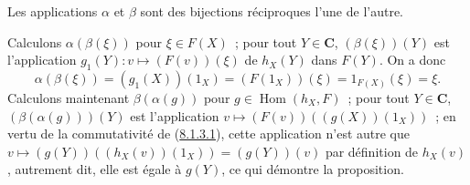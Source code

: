 \begin{proposition}[8.1.4]
\label{0.8.1.4-fr}
Les applications $\alpha$ et $\beta$ sont des bijections réciproques l'une de
l'autre.
\end{proposition}

Calculons $\alpha(\beta(\xi))$ pour $\xi\in F(X)$~; pour tout $Y\in\boldsymbol{C}$,
$(\beta(\xi))(Y)$ est l'application
$g_1(Y):v\mapsto(F(v))(\xi)$ de $h_X(Y)$ dans $F(Y)$. On a donc
\[
  \alpha(\beta(\xi))=(g_1(X))(1_X)=(F(1_X))(\xi)
  =1_{F(X)}(\xi)=\xi.
\]
Calculons maintenant $\beta(\alpha(g))$ pour
$g\in\operatorname{Hom}(h_X,F)$~; pour tout $Y\in\boldsymbol{C}$,
$(\beta(\alpha(g)))(Y)$ est l'application
$v\mapsto(F(v))((g(X))(1_X))$~; en vertu de la commutativité de
(\hyperref[0.8.1.3.1-fr]{8.1.3.1}), cette application n'est autre que
$v\mapsto(g(Y))((h_X(v))(1_X))=(g(Y))(v)$ par définition de $h_X(v)$,
autrement dit, elle est égale à $g(Y)$, ce qui démontre la proposition.

